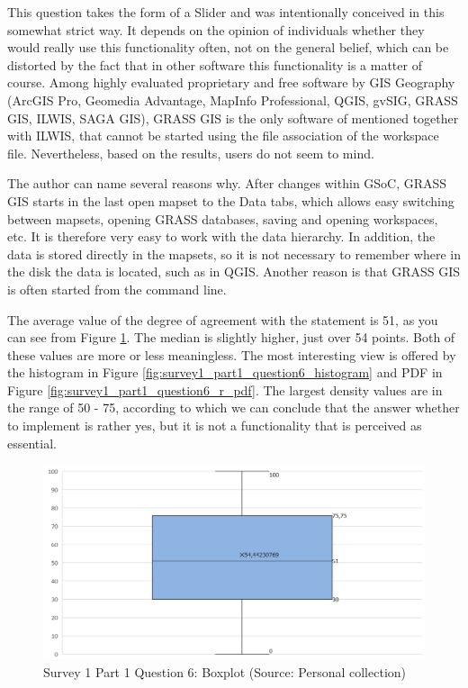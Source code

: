 \documentclass[a4paper,10pt,twoside]{article}
\begin{document}
\noindent This question takes the form of a Slider and was
intentionally conceived in this somewhat strict way. It depends on the
opinion of individuals whether they would really use this
functionality often, not on the general belief, which can be distorted
by the fact that in other software this functionality is a matter of
course. Among highly evaluated proprietary and free software by
GIS Geography \cite{gisgeography} (ArcGIS Pro, Geomedia Advantage,
MapInfo Professional, QGIS, gvSIG, GRASS GIS, ILWIS, SAGA GIS), 
GRASS GIS is the only software of
mentioned together with ILWIS, that cannot be started using the file
association of the workspace file. Nevertheless, based on the results,
users do not seem to mind.

The author can name several reasons why. After changes within GSoC,
GRASS GIS starts in the last open mapset to the Data tabs, which
allows easy switching between mapsets, opening GRASS databases, saving
and opening workspaces, etc. It is therefore very easy to work with
the data hierarchy. In addition, the data is stored directly in the
mapsets, so it is not necessary to remember where in the disk the data
is located, such as in QGIS. Another reason is that GRASS GIS is often
started from the command line.

The average value of the degree of agreement with the statement is 51,
as you can see from Figure
\ref{fig:survey1_part1_question6_boxplot}. The median is slightly
higher, just over 54 points. Both of these values are more or less
meaningless. The most interesting view is offered by the histogram in
Figure \ref{fig:survey1_part1_question6_histogram} and PDF in Figure
\ref{fig:survey1_part1_question6_r_pdf}. The largest density values
are in the range of 50 - 75, according to which we can conclude that
the answer whether to implement is rather yes, but it is not a
functionality that is perceived as essential.

\vspace{0.3cm}
\begin{figure}[hbt!] 
\begin{center}
\includegraphics[width=12.5cm]{../surveys/analyzed_data/survey1_part1_question6_boxplot.png} 
\caption[Survey 1 Part 1 Question 6: Boxplot]{Survey 1 Part 1 Question 6: Boxplot (Source: Personal collection)}
\label{fig:survey1_part1_question6_boxplot}
\end{center}
\end{figure}
\end{document}
